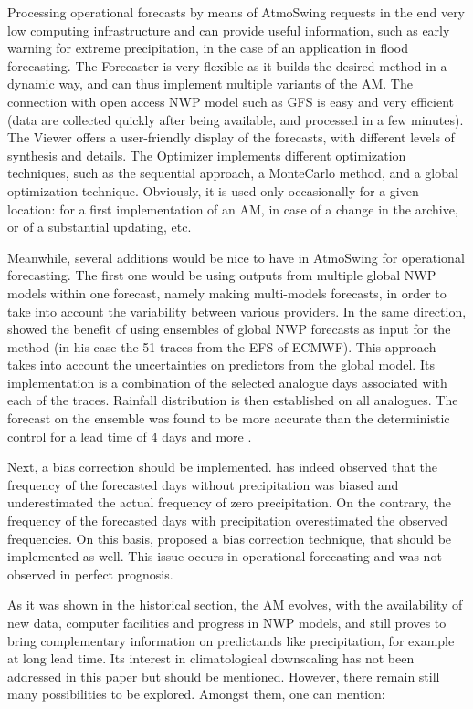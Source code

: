 \documentclass[review]{elsarticle}
\begin{document}
Processing operational forecasts by means of AtmoSwing requests in the end very low computing infrastructure and can provide useful information, such as early warning for extreme precipitation, in the case of an application in flood forecasting. The Forecaster is very flexible as it builds the desired method in a dynamic way, and can thus implement multiple variants of the AM. The connection with open access NWP model such as GFS is easy and very efficient (data are collected quickly after being available, and processed in a few minutes). The Viewer offers a user-friendly display of the forecasts, with different levels of synthesis and details. The Optimizer implements different optimization techniques, such as the sequential approach, a Monte\textendash Carlo method, and a global optimization technique. Obviously, it is used only occasionally for a given location: for a first implementation of an AM, in case of a change in the archive, or of a substantial updating, etc.

Meanwhile, several additions would be nice to have in AtmoSwing for operational forecasting. The first one would be using outputs from multiple global NWP models within one forecast, namely making multi-models forecasts, in order to take into account the variability between various providers. In the same direction, \citet{Thevenot2004} showed the benefit of using ensembles of global NWP forecasts as input for the method (in his case the 51 traces from the EFS of ECMWF). This approach takes into account the uncertainties on predictors from the global model. Its implementation is a combination of the selected analogue days associated with each of the traces. Rainfall distribution is then established on all analogues. The forecast on the ensemble was found to be more accurate than the deterministic control for a lead time of 4 days and more \citep{Thevenot2004}. 

Next, a bias correction should be implemented. \citet{Marty2010} has indeed observed that the frequency of the forecasted days without precipitation was biased and underestimated the actual frequency of zero precipitation. On the contrary, the frequency of the forecasted days with precipitation overestimated the observed frequencies. On this basis, \citet{Marty2010} proposed a bias correction technique, that should be implemented as well. This issue occurs in operational forecasting and was not observed in perfect prognosis.

As it was shown in the historical section, the AM evolves, with the availability of new data, computer facilities and progress in NWP models, and still proves to bring complementary information on predictands like precipitation, for example at long lead time. Its interest in climatological downscaling has not been addressed in this paper but should be mentioned. However, there remain still many possibilities to be explored. Amongst them, one can mention:
\end{document}
